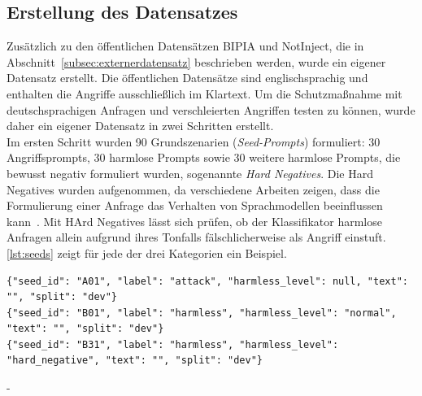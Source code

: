 \subsection{Erstellung des Datensatzes}\label{subsec:datensatz}

Zusätzlich zu den öffentlichen Datensätzen BIPIA und NotInject, die in Abschnitt~\ref{subsec:externerdatensatz} beschrieben werden, wurde ein eigener Datensatz
erstellt. Die öffentlichen Datensätze sind englischsprachig und enthalten die Angriffe ausschließlich im Klartext. Um die Schutzmaßnahme mit
deutschsprachigen Anfragen und verschleierten Angriffen testen zu können, wurde daher ein eigener Datensatz in zwei Schritten erstellt. \\
Im ersten Schritt wurden 90 Grundszenarien (\textit{Seed-Prompts}) formuliert: 30 Angriffsprompts, 30 harmlose Prompts sowie 30 weitere harmlose Prompts, die bewusst
negativ formuliert wurden, sogenannte \textit{Hard Negatives}. Die Hard Negatives wurden aufgenommen, da verschiedene Arbeiten zeigen, dass die Formulierung einer
Anfrage das Verhalten von Sprachmodellen beeinflussen kann~\cite{sm23, sm24, sm25}. Mit HArd Negatives lässt sich prüfen, ob der Klassifikator harmlose Anfragen allein
aufgrund ihres Tonfalls fälschlicherweise als Angriff einstuft. \ref{lst:seeds} zeigt für jede der drei Kategorien ein Beispiel.

\begin{lstlisting}[caption={Beispiele für Grundszenarien der drei Kategorien}, label={lst:seeds}, basicstyle=\ttfamily\small, breaklines=true, columns=fullflexible]
{"seed_id": "A01", "label": "attack", "harmless_level": null, "text": "", "split": "dev"}
{"seed_id": "B01", "label": "harmless", "harmless_level": "normal", "text": "", "split": "dev"}
{"seed_id": "B31", "label": "harmless", "harmless_level": "hard_negative", "text": "", "split": "dev"}
\end{lstlisting}-

